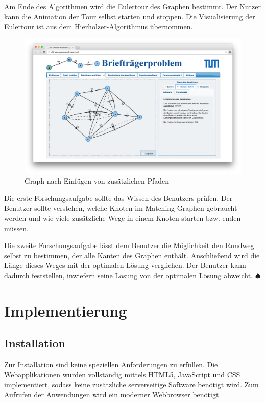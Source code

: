 Am Ende des Algorithmen wird die Eulertour des Graphen bestimmt. Der Nutzer kann die Animation der Tour selbst starten und stoppen. Die Visualisierung der Eulertour ist aus dem Hierholzer-Algorithmus übernommen.

\begin{figure}[h!]
	\centering
	\includegraphics[width=\textwidth]{figures/postman_eulerian}
	\caption[Chinese-Postman: Eulerscher Graph]{Graph nach Einfügen von zusätzlichen Pfaden}\label{fig:postman_eulerian}
\end{figure}

Die erste Forschungsaufgabe sollte das Wissen des Benutzers prüfen. Der Benutzer sollte verstehen, welche Knoten im Matching-Graphen gebraucht werden und wie viele zusätzliche Wege in einem Knoten starten bzw. enden müssen.

Die zweite Forschungsaufgabe lässt dem Benutzer die Möglichkeit den Rundweg selbst zu bestimmen, der alle Kanten des Graphen enthält. Anschließend wird die Länge dieses Weges mit der optimalen Lösung verglichen. Der Benutzer kann dadurch feststellen, inwiefern seine Lösung von der optimalen Lösung abweicht. \hfill$\spadesuit$

\chapter{Implementierung}

\section{Installation} %
Zur Installation sind keine speziellen Anforderungen zu erfüllen. Die Webapplikationen wurden vollständig mittels HTML5, JavaScript und CSS implementiert, sodass keine zusätzliche serverseitige Software benötigt wird. Zum Aufrufen der Anwendungen wird ein moderner Webbrowser benötigt.

